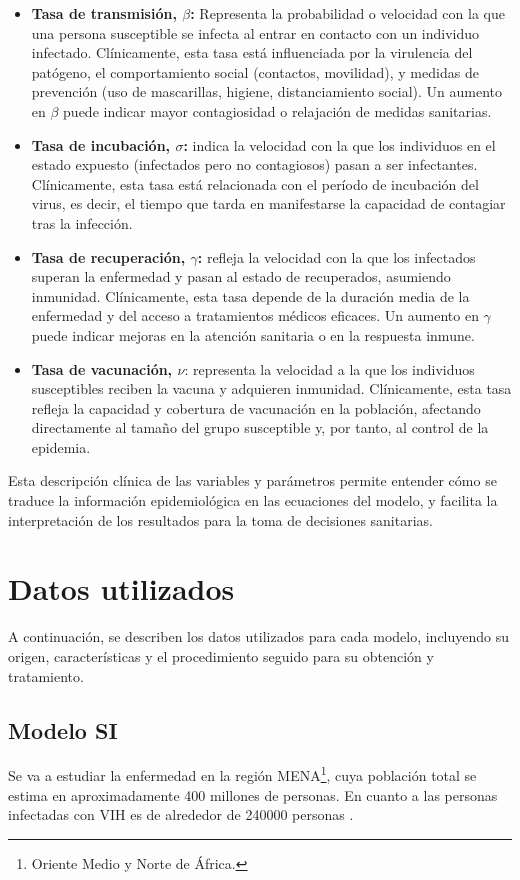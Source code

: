 \begin{itemize}
    \item \textbf{Tasa de transmisión, $\beta$:} Representa la probabilidad o velocidad con la que una persona susceptible se infecta al entrar en contacto con un individuo infectado. Clínicamente, esta tasa está influenciada por la virulencia del patógeno, el comportamiento social (contactos, movilidad), y medidas de prevención (uso de mascarillas, higiene, distanciamiento social). Un aumento en $\beta$ puede indicar mayor contagiosidad o relajación de medidas sanitarias.
    \item \textbf{Tasa de incubación, $\sigma$:} indica la velocidad con la que los individuos en el estado expuesto (infectados pero no contagiosos) pasan a ser infectantes. Clínicamente, esta tasa está relacionada con el período de incubación del virus, es decir, el tiempo que tarda en manifestarse la capacidad de contagiar tras la infección.
    \item \textbf{Tasa de recuperación, $\gamma$:} refleja la velocidad con la que los infectados superan la enfermedad y pasan al estado de recuperados, asumiendo inmunidad. Clínicamente, esta tasa depende de la duración media de la enfermedad y del acceso a tratamientos médicos eficaces. Un aumento en $\gamma$ puede indicar mejoras en la atención sanitaria o en la respuesta inmune.
    \item \textbf{Tasa de vacunación, $\nu$}: representa la velocidad a la que los individuos susceptibles reciben la vacuna y adquieren inmunidad. Clínicamente, esta tasa refleja la capacidad y cobertura de vacunación en la población, afectando directamente al tamaño del grupo susceptible y, por tanto, al control de la epidemia.
    
\end{itemize}

Esta descripción clínica de las variables y parámetros permite entender cómo se traduce la información epidemiológica en las ecuaciones del modelo, y facilita la interpretación de los resultados para la toma de decisiones sanitarias.

\section{Datos utilizados}
A continuación, se describen los datos utilizados para cada modelo, incluyendo su origen, características y el procedimiento seguido para su obtención y tratamiento.

\subsection{Modelo SI}
Se va a estudiar la enfermedad en la región MENA\footnote{Oriente Medio y Norte de África.}, cuya población total se estima en aproximadamente 400 millones de personas. En cuanto a las personas infectadas con VIH es de alrededor de 240000 personas \cite{Khorrami2023}.

